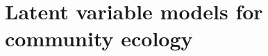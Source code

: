 \documentclass[8pt]{beamer}
\begin{document}
% 
%   
% 

\section{Latent variable models for community ecology}
\end{document}

